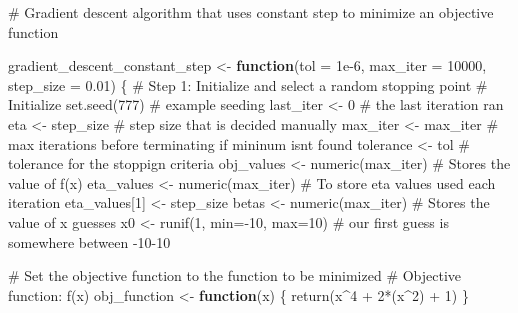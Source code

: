 \documentclass[
  letterpaper,
  DIV=11,
  numbers=noendperiod]{scrartcl}
\newenvironment{Shaded}{\begin{snugshade}}{\end{snugshade}}
\newcommand{\AttributeTok}[1]{\textcolor[rgb]{0.40,0.45,0.13}{#1}}
\newcommand{\CommentTok}[1]{\textcolor[rgb]{0.37,0.37,0.37}{#1}}
\newcommand{\ControlFlowTok}[1]{\textcolor[rgb]{0.00,0.23,0.31}{\textbf{#1}}}
\newcommand{\DecValTok}[1]{\textcolor[rgb]{0.68,0.00,0.00}{#1}}
\newcommand{\FloatTok}[1]{\textcolor[rgb]{0.68,0.00,0.00}{#1}}
\newcommand{\FunctionTok}[1]{\textcolor[rgb]{0.28,0.35,0.67}{#1}}
\newcommand{\NormalTok}[1]{\textcolor[rgb]{0.00,0.23,0.31}{#1}}
\newcommand{\OtherTok}[1]{\textcolor[rgb]{0.00,0.23,0.31}{#1}}
\newcommand{\SpecialCharTok}[1]{\textcolor[rgb]{0.37,0.37,0.37}{#1}}
\begin{document}
\begin{Shaded}
\begin{Highlighting}[]
\CommentTok{\# Gradient descent algorithm that uses constant step to minimize an objective function}

\NormalTok{gradient\_descent\_constant\_step }\OtherTok{\textless{}{-}} \ControlFlowTok{function}\NormalTok{(}\AttributeTok{tol =} \FloatTok{1e{-}6}\NormalTok{, }\AttributeTok{max\_iter =} \DecValTok{10000}\NormalTok{, }\AttributeTok{step\_size =} \FloatTok{0.01}\NormalTok{) \{}
  \CommentTok{\# Step 1: Initialize and select a random stopping point}
  \CommentTok{\# Initialize}
  \FunctionTok{set.seed}\NormalTok{(}\DecValTok{777}\NormalTok{) }\CommentTok{\# example seeding }
\NormalTok{  last\_iter }\OtherTok{\textless{}{-}} \DecValTok{0} \CommentTok{\# the last iteration ran}
\NormalTok{  eta }\OtherTok{\textless{}{-}}\NormalTok{ step\_size }\CommentTok{\# step size that is decided manually }
\NormalTok{  max\_iter }\OtherTok{\textless{}{-}}\NormalTok{ max\_iter }\CommentTok{\# max iterations before terminating if mininum isn\textquotesingle{}t found}
\NormalTok{  tolerance }\OtherTok{\textless{}{-}}\NormalTok{ tol }\CommentTok{\# tolerance for the stoppign criteria }
\NormalTok{  obj\_values }\OtherTok{\textless{}{-}} \FunctionTok{numeric}\NormalTok{(max\_iter) }\CommentTok{\# Stores the value of f(x)}
\NormalTok{  eta\_values }\OtherTok{\textless{}{-}} \FunctionTok{numeric}\NormalTok{(max\_iter)  }\CommentTok{\# To store eta values used each iteration}
\NormalTok{  eta\_values[}\DecValTok{1}\NormalTok{] }\OtherTok{\textless{}{-}}\NormalTok{ step\_size}
\NormalTok{  betas }\OtherTok{\textless{}{-}} \FunctionTok{numeric}\NormalTok{(max\_iter) }\CommentTok{\# Stores the value of x guesses}
\NormalTok{  x0 }\OtherTok{\textless{}{-}} \FunctionTok{runif}\NormalTok{(}\DecValTok{1}\NormalTok{, }\AttributeTok{min=}\SpecialCharTok{{-}}\DecValTok{10}\NormalTok{, }\AttributeTok{max=}\DecValTok{10}\NormalTok{) }\CommentTok{\# our first guess is somewhere between {-}10{-}10}
  
  \CommentTok{\# Set the objective function to the function to be minimized }
  \CommentTok{\# Objective function: f(x)}
\NormalTok{  obj\_function }\OtherTok{\textless{}{-}} \ControlFlowTok{function}\NormalTok{(x) \{}
    \FunctionTok{return}\NormalTok{(x}\SpecialCharTok{\^{}}\DecValTok{4} \SpecialCharTok{+} \DecValTok{2}\SpecialCharTok{*}\NormalTok{(x}\SpecialCharTok{\^{}}\DecValTok{2}\NormalTok{) }\SpecialCharTok{+} \DecValTok{1}\NormalTok{) }
\NormalTok{  \}}
  

\end{Highlighting}
\end{Shaded}
\end{document}

